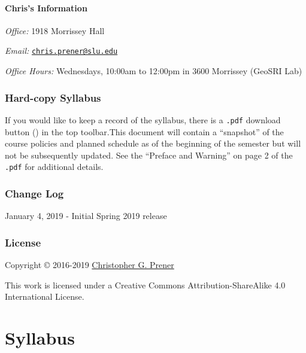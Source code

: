 \documentclass[]{book}
\begin{document}
\hypertarget{chriss-information}{%
\subsection*{Chris's Information}\label{chriss-information}}

\emph{Office:} 1918 Morrissey Hall

\emph{Email:} \href{mailto:chris.prener@slu.edu}{\nolinkurl{chris.prener@slu.edu}}

\emph{Office Hours:} Wednesdays, 10:00am to 12:00pm in 3600 Morrissey (GeoSRI Lab)

\hypertarget{hard-copy-syllabus}{%
\section*{Hard-copy Syllabus}\label{hard-copy-syllabus}}

If you would like to keep a record of the syllabus, there is a \texttt{.pdf} download button () in the top toolbar.This document will contain a ``snapshot'' of the course policies and planned schedule as of the beginning of the semester but will not be subsequently updated. See the ``Preface and Warning'' on page 2 of the \texttt{.pdf} for additional details.

\hypertarget{change-log}{%
\section*{Change Log}\label{change-log}}

January 4, 2019 - Initial Spring 2019 release

\hypertarget{license}{%
\section*{License}\label{license}}

Copyright © 2016-2019 \href{https://chris-prener.github.io}{Christopher G. Prener}

This work is licensed under a Creative Commons Attribution-ShareAlike 4.0 International License.

\hypertarget{part-syllabus}{%
\part{Syllabus}\label{part-syllabus}}
\end{document}
